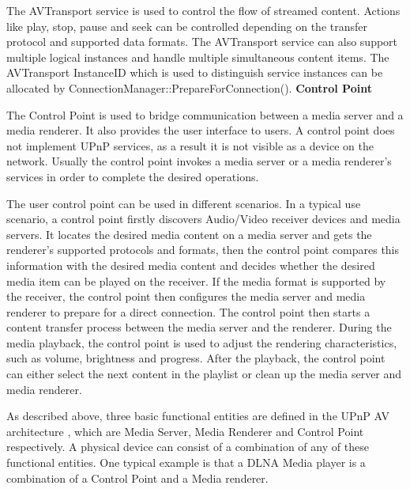 The AVTransport service is used to control the flow of streamed content. Actions 
like play, stop, pause and seek can be controlled depending on the transfer 
protocol and supported data formats. The AVTransport service can also support 
multiple logical instances and handle multiple simultaneous content items. The 
AVTransport InstanceID which is used to distinguish service instances can be 
allocated by ConnectionManager::PrepareForConnection(). 
\clearpage
\textbf{Control Point} 

The Control Point is used to bridge communication between a media server and a media renderer. 
It also provides the user interface to users. A control point does not implement UPnP 
services, as a result it is not visible as a device on the network. Usually the control point 
invokes a media server or a media renderer's services in order to complete the 
desired operations.

The user control point can be used in different scenarios. In a typical use
scenario, a control point firstly discovers Audio/Video receiver devices and
media servers. It locates the desired media content on a media server and gets
the renderer's supported protocols and formats, then the control point compares
this information with the desired media content and decides whether the desired
media item can be played on the receiver. If the media format is supported by
the receiver, the control point then configures the media server and media
renderer to prepare for a direct connection. The control point then starts a
content transfer process between the media server and the renderer. During the
media playback, the control point is used to adjust the rendering
characteristics, such as volume, brightness and progress. After the playback,
the control point can either select the next content in the playlist or clean up
the media server and media renderer.

As described above, three basic functional entities are defined in the UPnP AV 
architecture \cite{upnp-av}, which are Media Server, Media Renderer and Control
Point respectively. A physical device can consist of a combination of any of
these functional entities. One typical example is that a DLNA Media player is a
combination of a Control Point and a Media renderer.

